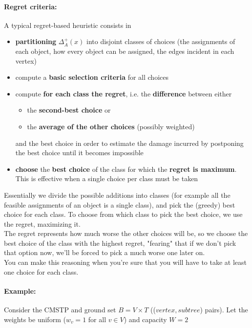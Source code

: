 \documentclass[11pt]{article}
\begin{document}
	\paragraph{Regret criteria:} A typical regret-based heuristic consists in
	\begin{itemize}
		\item \textbf{partitioning} $\Delta_A^+ (x)$ into disjoint classes of choices (the assignments of each object, how every object can be assigned, the edges incident in each vertex)
		
		\item compute a \textbf{basic selection criteria} for all choices
		
		\item compute \textbf{for each class the regret}, i.e. the \textbf{difference} between either
		\begin{itemize}
			\item the \textbf{second-best choice} or
			\item the \textbf{average of the other choices} (possibly weighted)
		\end{itemize}
		and the best choice in order to estimate the damage incurred by postponing the best choice until it becomes impossible
		
		\item \textbf{choose} the \textbf{best choice} of the class for which the \textbf{regret is maximum}. This is effective when a single choice per class must be taken
	\end{itemize}
	
	Essentially we divide the possible additions into classes (for example all the feasible assignments of an object is a single class), and pick the (greedy) best choice for each class. To choose from which class to pick the best choice, we use the regret, maximizing it.\\
	
	The regret represents how much worse the other choices will be, so we choose the best choice of the class with the highest regret, "fearing" that if we don't pick that option now, we'll be forced to pick a much worse one later on. \\
	
	You can make this reasoning when you're sure that you will have to take at least one choice for each class.\\
	
	\paragraph{Example:} Consider the CMSTP and ground set $B = V \times T$ (($vertex,subtree$) pairs). Let the weights be uniform ($w_v = 1$ for all $v \in V$) and capacity $W = 2$
	
\end{document}
